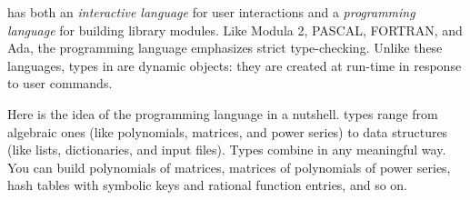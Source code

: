 
%
%
%
%
%


\texht{\setcounter{chapter}{-1}}{}


\Language{} has both
an {\it interactive
language} for user interactions and a
{\it programming language} for building library modules.
Like Modula 2,
PASCAL,
FORTRAN,
and Ada,
the programming language emphasizes strict type-checking.
Unlike these languages, types in \Language{} are dynamic
objects: they are created at run-time in response to user
commands.

Here is the idea of the \Language{} programming language in a nutshell.
\Language{} types range from
algebraic ones (like polynomials,
matrices, and power series) to data structures (like
lists, dictionaries, and input files).
Types combine in any meaningful way.
You can build
polynomials of matrices, matrices of polynomials of
power series, hash tables with symbolic keys and rational function entries,
and so on.

